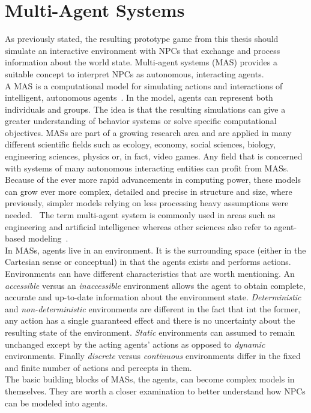 \section{Multi-Agent Systems}
As previously stated, the resulting prototype game from this thesis should simulate an interactive environment with NPCs that exchange and process information about the world state. Multi-agent systems (MAS) provides a suitable concept to interpret NPCs as autonomous, interacting agents.\\
A MAS is a computational model for simulating actions and interactions of intelligent, autonomous agents~\cite{Wooldridge2009}. In the model, agents can represent both individuals and groups. The idea is that the resulting simulations can give a greater understanding of behavior systems or solve specific computational objectives. MASs are part of a growing research area and are applied in many different scientific fields such as ecology, economy, social sciences, biology, engineering sciences, physics or, in fact, video games. Any field that is concerned with systems of many autonomous interacting entities can profit from MASs. Because of the ever more rapid advancements in computing power, these models can grow ever more complex, detailed and precise in structure and size, where previously, simpler models relying on less processing heavy assumptions were needed.~\cite{Helbing2012} The term multi-agent system is commonly used in areas such as engineering  and artificial intelligence whereas other sciences also refer to agent-based modeling~\cite{Niazi2011}.\\
In MASs, agents live in an environment. It is the surrounding space (either in the Cartesian sense or conceptual) in that the agents exists and performs actions. Environments can have different characteristics that are worth mentioning. An \textit{accessible} versus an \textit{inaccessible} environment allows the agent to obtain complete, accurate and up-to-date information about the environment state. \textit{Deterministic} and \textit{non-deterministic} environments are different in the fact that int the former, any action has a single guaranteed effect and there is no uncertainty about the resulting state of the environment. \textit{Static} environments can assumed to remain unchanged except by the acting agents' actions as opposed to \textit{dynamic} environments. Finally \textit{discrete} versus \textit{continuous} environments differ in the fixed and finite number of actions and percepts in them.~\cite{Wooldridge2009}\\
The basic building blocks of MASs, the agents, can become complex models in themselves. They are worth a closer examination to better understand how NPCs can be modeled into agents.
